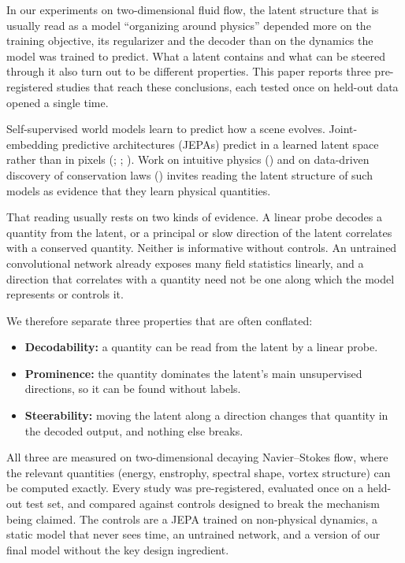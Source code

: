\documentclass[10pt]{article}
\begin{document}
In our experiments on two-dimensional fluid flow, the latent structure that is usually read as a model ``organizing around physics'' depended more on the training objective, its regularizer and the decoder than on the dynamics the model was trained to predict. What a latent contains and what can be steered through it also turn out to be different properties. This paper reports three pre-registered studies that reach these conclusions, each tested once on held-out data opened a single time.

Self-supervised world models learn to predict how a scene evolves. Joint-embedding predictive architectures (JEPAs) predict in a learned latent space rather than in pixels (\citealp{lecun2022path}; \citealp{assran2023ijepa}; \citealp{bardes2024vjepa}). Work on intuitive physics (\citealp{piloto2022intuitive}) and on data-driven discovery of conservation laws (\citealp{liu2021conservation}) invites reading the latent structure of such models as evidence that they learn physical quantities.

That reading usually rests on two kinds of evidence. A linear probe decodes a quantity from the latent, or a principal or slow direction of the latent correlates with a conserved quantity. Neither is informative without controls. An untrained convolutional network already exposes many field statistics linearly, and a direction that correlates with a quantity need not be one along which the model represents or controls it.

We therefore separate three properties that are often conflated:

\begin{itemize}
\item \textbf{Decodability:} a quantity can be read from the latent by a linear probe.
\item \textbf{Prominence:} the quantity dominates the latent's main unsupervised directions, so it can be found without labels.
\item \textbf{Steerability:} moving the latent along a direction changes that quantity in the decoded output, and nothing else breaks.
\end{itemize}

All three are measured on two-dimensional decaying Navier--Stokes flow, where the relevant quantities (energy, enstrophy, spectral shape, vortex structure) can be computed exactly. Every study was pre-registered, evaluated once on a held-out test set, and compared against controls designed to break the mechanism being claimed. The controls are a JEPA trained on non-physical dynamics, a static model that never sees time, an untrained network, and a version of our final model without the key design ingredient.
\end{document}
